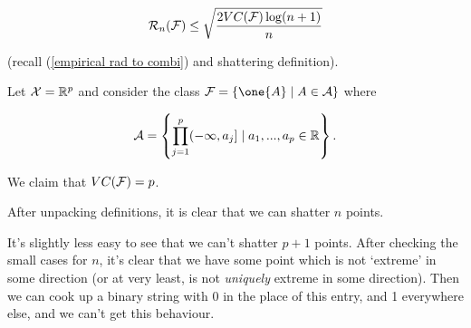 \documentclass[11pt]{scrartcl}
\begin{document}
\label{rademacher VC bound}

\begin{corollary}
\begin{equation}
    \R_n(\F) \le \sqrt{\frac{ 2 VC(\F) \log(n+1) }{n}} %
\end{equation}

(recall (\ref{empirical rad to combi}) and shattering definition).
\end{corollary}


\begin{example}
Let $\mathcal{X} = \mathbb R^p$ and consider the class $\F = \{ \one{A} \mid A \in \A \}$ where

\begin{equation}
    \mathcal{A} = \left\{ \prod_{j=1}^p ( - \infty, a_j ] \mid a_1, ... , a_p \in \mathbb R \right\}.
\end{equation}

We claim that $VC(\mathcal{F}) = p$. 

After unpacking definitions, it is clear that we can shatter $n$ points.

It's slightly less easy to see that we can't shatter $p+1$ points. After checking the small cases for $n$, it's clear that we have some point which is not `extreme' in some direction (or at very least, is not \textit{uniquely} extreme in some direction). Then we can cook up a binary string with 0 in the place of this entry, and 1 everywhere else, and we can't get this behaviour.
\end{example}
\end{document}
